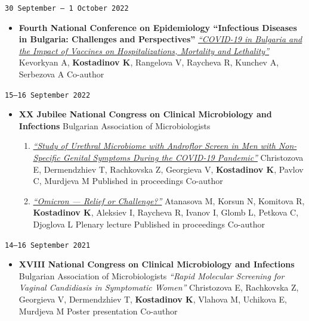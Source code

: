\documentclass[
  10.5pt,
  a4paper,
  DIV=11,
  numbers=noendperiod]{scrartcl}
\providecommand{\tightlist}{%
  \setlength{\itemsep}{0pt}\setlength{\parskip}{0pt}}
\let\oldtexttt\texttt
\renewcommand{\texttt}[1]{{\color{cvbronze}\small\oldtexttt{#1}}}
\begin{document}
\texttt{30\ September\ –\ 1\ October\ 2022}

\begin{itemize}
\tightlist
\item
  \textbf{Fourth National Conference on Epidemiology ``Infectious
  Diseases in Bulgaria: Challenges and Perspectives''} \textbar{}
  \emph{\href{http://bulepid.org/_upload2018/PROGRAMA\%202022-pre-final\%20-\%20Copy.pdf}{``COVID-19
  in Bulgaria and the Impact of Vaccines on Hospitalizations, Mortality
  and Lethality''}} \textbar{} Kevorkyan A, \textbf{Kostadinov K},
  Rangelova V, Raycheva R, Kunchev A, Serbezova A \textbar{} Co-author
\end{itemize}

\texttt{15–16\ September\ 2022}

\begin{itemize}
\tightlist
\item
  \textbf{XX Jubilee National Congress on Clinical Microbiology and
  Infections} \textbar{} Bulgarian Association of Microbiologists

  \begin{enumerate}
  \def\labelenumi{\arabic{enumi}.}
  \tightlist
  \item
    \emph{\href{https://www.bam-bg.net/images/documents/3Posters.pdf}{``Study
    of Urethral Microbiome with Androflor Screen in Men with
    Non-Specific Genital Symptoms During the COVID-19 Pandemic''}}
    \textbar{} Christozova E, Dermendzhiev T, Rachkovska Z, Georgieva V,
    \textbf{Kostadinov K}, Pavlov C, Murdjeva M \textbar{} Published in
    proceedings \textbar{} Co-author
  \item
    \emph{\href{https://www.bam-bg.net/images/documents/2Abstracts.pdf}{``Omicron
    --- Relief or Challenge?''}} \textbar{} Atanasova M, Korsun N,
    Komitova R, \textbf{Kostadinov K}, Aleksiev I, Raycheva R, Ivanov I,
    Glomb L, Petkova C, Djoglova L \textbar{} Plenary lecture \textbar{}
    Published in proceedings \textbar{} Co-author
  \end{enumerate}
\end{itemize}

\texttt{14–16\ September\ 2021}

\begin{itemize}
\tightlist
\item
  \textbf{XVIII National Congress on Clinical Microbiology and
  Infections} \textbar{} Bulgarian Association of Microbiologists
  \textbar{} \emph{``Rapid Molecular Screening for Vaginal Candidiasis
  in Symptomatic Women''} \textbar{} Christozova E, Rachkovska Z,
  Georgieva V, Dermendzhiev T, \textbf{Kostadinov K}, Vlahova M,
  Uchikova E, Murdjeva M \textbar{} Poster presentation \textbar{}
  Co-author
\end{itemize}
\end{document}
